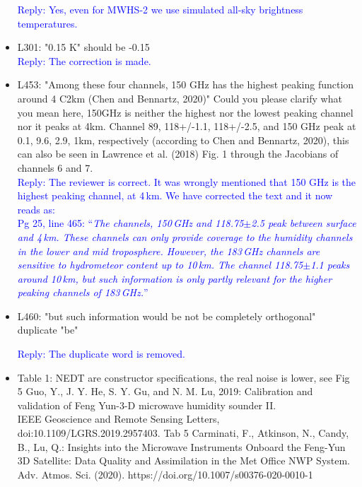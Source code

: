\documentclass[11pt,a4paper,draft]{article}
\begin{document}
\begin{itemize}
\textcolor{blue}{Reply: Yes, even for MWHS-2 we use simulated all-sky brightness temperatures.}\\
		
		
\item	L301: "0.15 K" should be -0.15 \\
		
\textcolor{blue}{Reply: The correction is made.} \\
		
		
	
\item	
		L453: "Among these four channels, 150 GHz has the highest peaking function around 4
		C2km (Chen and Bennartz, 2020)" Could you please clarify what you mean here, 150GHz
		is neither the highest nor the lowest peaking channel nor it peaks at 4km. Channel 89,
		118+/-1.1, 118+/-2.5, and 150 GHz peak at 0.1, 9.6, 2.9, 1km, respectively (according
		to Chen and Bennartz, 2020), this can also be seen in Lawrence et al. (2018) Fig. 1
		through the Jacobians of channels 6 and 7.\\
	
\textcolor{blue}{Reply: The reviewer is correct. It was wrongly mentioned that 150 GHz is the highest peaking channel, at 4\,km. We have corrected the text and it now reads as:	\\
Pg 25, line 465:	
``\textit{The channels, 150\,GHz and 118.75$\pm$2.5 peak between surface and 4\,km. These channels can only provide coverage to the humidity channels in the lower and mid troposphere. However, the 183\,GHz channels are sensitive to hydrometeor content up to 10\,km. The channel 118.75$\pm$1.1 peaks around 10\,km, but such information is only partly relevant for the higher peaking channels of 183\,GHz.}'' }\\

		
\item	L460: "but such information would be not be completely orthogonal" duplicate "be"
		
\textcolor{blue}{Reply: The duplicate word is removed. }\\
		
		
		
\item	
		Table 1: NEDT are constructor specifications, the real noise is lower, see
		Fig 5 Guo, Y., J. Y. He, S. Y. Gu, and N. M. Lu, 2019: Calibration and validation of
		Feng Yun-3-D microwave humidity sounder II. \\
		IEEE Geoscience and Remote Sensing
		Letters, doi:10.1109/LGRS.2019.2957403.
		Tab 5 Carminati, F., Atkinson, N., Candy, B., Lu, Q.: Insights into the Microwave Instruments Onboard the Feng-Yun 3D Satellite: Data Quality and Assimilation in the Met Office NWP System. Adv. Atmos. Sci. (2020). https://doi.org/10.1007/s00376-020-0010-1 \\
	

\end{itemize}
\end{document}
